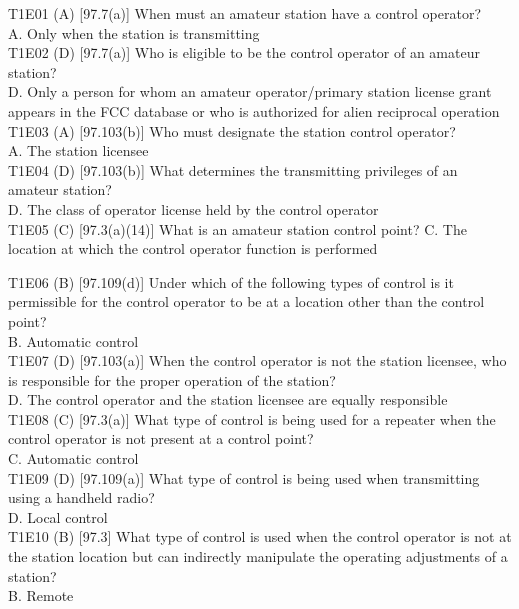 \documentclass[12pt,letterpaper]{report}
\begin{document}
T1E01 (A) [97.7(a)] When must an amateur station have a control operator?\\
A. Only when the station is transmitting\\

T1E02 (D) [97.7(a)] Who is eligible to be the control operator of an amateur station?\\
D. Only a person for whom an amateur operator/primary station license grant appears in the FCC database or who is authorized for alien reciprocal operation\\

T1E03 (A) [97.103(b)] Who must designate the station control operator?\\
A. The station licensee\\

T1E04 (D) [97.103(b)] What determines the transmitting privileges of an amateur station?\\
D. The class of operator license held by the control operator\\

T1E05 (C) [97.3(a)(14)] What is an amateur station control point?
C. The location at which the control operator function is performed

T1E06 (B) [97.109(d)] Under which of the following types of control is it permissible for the control operator to be at a location other than the control point?\\
B. Automatic control\\

T1E07 (D) [97.103(a)] When the control operator is not the station licensee, who is responsible for the proper operation of the station?\\
D. The control operator and the station licensee are equally responsible\\

T1E08 (C) [97.3(a)] What type of control is being used for a repeater when the control operator is not present at a control point?\\
C. Automatic control\\

T1E09 (D) [97.109(a)] What type of control is being used when transmitting using a handheld radio?\\
D. Local control\\

T1E10 (B) [97.3] What type of control is used when the control operator is not at the station location but can indirectly manipulate the operating adjustments of a station?\\
B. Remote\\
\end{document}
